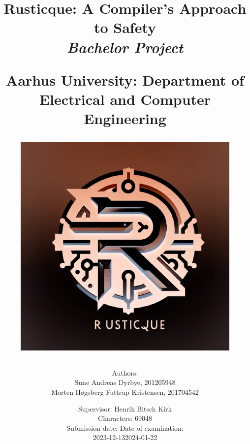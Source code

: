 \newcommand{\authorName}{}
\newcommand{\titleName}{Rusticque: A Compiler's Approach to Safety}
\newcommand{\subject}{Bachelor Project}
\newcommand{\vejleder}{Supervisor: Henrik Bitsch Kirk}
\newcommand{\institute}{Aarhus University: Department of Electrical and Computer Engineering}
\begin{titlepage}
  \centering
    \title
    {
      \Huge \textbf{\titleName}\\
      \scale{\numberSQRTTWO}{\vspace{\sol pt}}
      \LARGE \textit{\subject}
      \scale{\numberSQRTTWO}{\rule{\linewidth}{\sol pt}}

      \textbf{\institute}

      \begin{figure}[h]
        \centering
        \includegraphics[scale=0.50]{02-Body/Images/rusticqueLogo.png}
      \end{figure}

      \author
    {
      \LARGE Authors: \\
      Sune Andreas Dyrbye, 201205948 \\
      Morten Høgsberg Futtrup Kristensen, 201704542 \\
      }
           \date{
        \Large \vejleder \\
        Characters: 69048\\
        \vspace{1em}
        Submission date: \hfill
        Date of examination:\\
        2023-12-13\hfill 2024-01-22
      }


    }
   
\end{titlepage}
